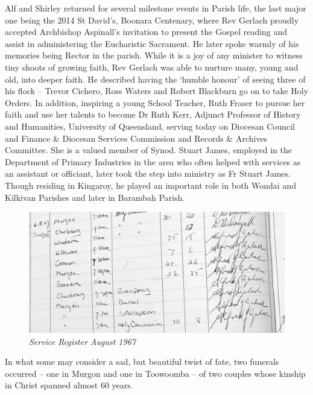 Alf and Shirley returned for several milestone events in Parish life, the last major one being the 2014 St David's, Boonara Centenary, where Rev Gerlach proudly accepted Archbishop Aspinall's invitation to present the Gospel reading and assist in administering the Eucharistic Sacrament. He later spoke warmly of his memories being Rector in the parish. While it is a joy of any minister to witness tiny shoots of growing faith, Rev Gerlach was able to nurture many, young and old, into deeper faith. He described having the `humble honour' of seeing three of his flock -- Trevor Cichero, Ross Waters and Robert Blackburn go on to take Holy Orders. In addition, inspiring a young School Teacher, Ruth Fraser to pursue her faith and use her talents to become Dr Ruth Kerr, Adjunct Professor of History and Humanities, University of Queensland, serving today on Diocesan Council and Finance \& Diocesan Services Commission and Records \& Archives Committee. She is a valued member of Synod. Stuart James, employed in the Department of Primary Industries in the area who often helped with services as an assistant or officiant, later took the step into ministry as Fr Stuart James. Though residing in Kingaroy, he played an important role in both Wondai and Kilkivan Parishes and later in Barambah Parish.









\begin{figure}[htb]
\begin{center}
\includegraphics[width=1.\textwidth,center]{../images/serviceRegisterAug1967.jpg}
\caption{\itshape Service Register August 1967}
\end{center}
\end{figure}




In what some may consider a sad, but beautiful twist of fate, two funerals occurred -- one in Murgon and one in Toowoomba -- of two couples whose kinship in Christ spanned almost 60 years.



